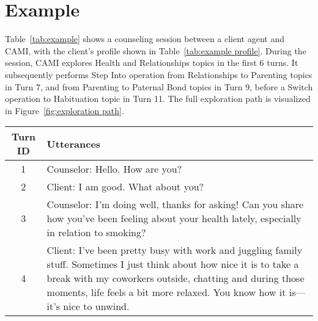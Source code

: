 \section{Example}
\label{app:example}

Table~\ref{tab:example} shows a counseling session between a client agent and CAMI, with the client's profile shown in Table~\ref{tab:example profile}. During the session, CAMI explores Health and Relationships topics in the first 6 turns.  It subsequently performs Step Into operation from Relationships to Parenting topics in Turn 7, and from Parenting to Paternal Bond topics in Turn 9, before a Switch operation to Habituation topic in Turn 11.  The full exploration path is visualized in Figure~\ref{fig:exploration path}.

\begin{table*}[ht]
\centering
\begin{tabularx}{\textwidth}{c X}
\toprule
        {\bf Turn ID} & {\bf Utterances}                     \\ \midrule
1       & Counselor: Hello. How are you?                                                                                                                                                                                                                                                                                                                     \\ \hline
2       & Client: I am good. What about you?                                                                                                                                                                                                                                                                                                                 \\ \hline
3       & Counselor: I'm doing well, thanks for asking! Can you share how you've been feeling about your health lately, especially in relation to smoking?                                                                                                                                                                                                   \\ \hline
4       & Client: I've been pretty busy with work and juggling family stuff. Sometimes I just think about how nice it is to take a break with my coworkers outside, chatting and during those moments, life feels a bit more relaxed. You know how it is—it’s nice to unwind.                                                                                \\ \hline

\end{tabularx}
\end{table*}
